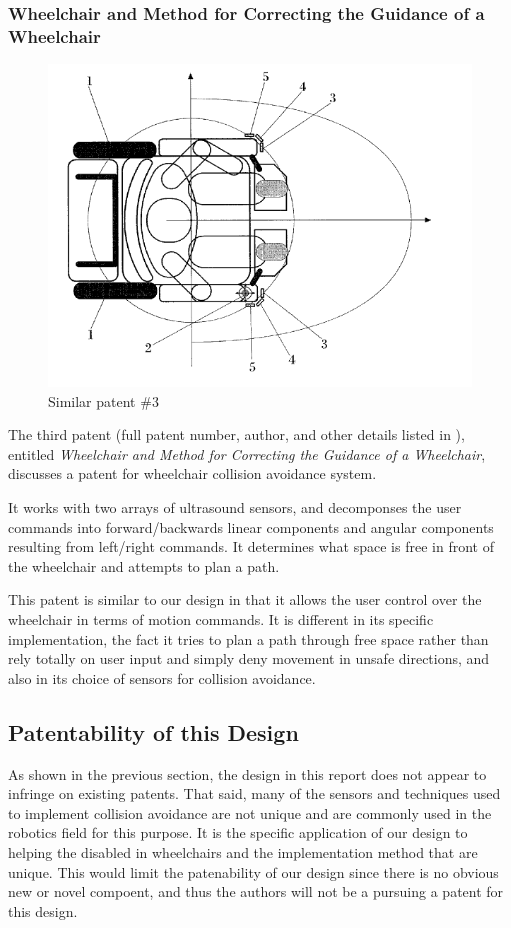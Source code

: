 \documentclass[oneside,final,a4paper]{report}
\begin{document}
\subsubsection{Wheelchair and Method for Correcting the Guidance of a Wheelchair}
\begin{figure}[hbt]
 \centering
 \includegraphics[scale=0.4]{patents3}
 \caption{Similar patent \#3 \cite{patent:wheelchair_method}}
\end{figure}

The third patent (full patent number, author, and other details listed in \cite{patent:wheelchair_method}), entitled \emph{Wheelchair and Method for Correcting the Guidance of a Wheelchair}, discusses a patent for wheelchair collision avoidance system.

It works with two arrays of ultrasound sensors, and decomponses the user commands into forward/backwards linear components and angular components resulting from left/right commands. It determines what space is free in front of the wheelchair and attempts to plan a path.

This patent is similar to our design in that it allows the user control over the wheelchair in terms of motion commands. It is different in its specific implementation, the fact it tries to plan a path through free space rather than rely totally on user input and simply deny movement in unsafe directions, and also in its choice of sensors for collision avoidance.

\subsection{Patentability of this Design}
As shown in the previous section, the design in this report does not appear to infringe on existing patents. That said, many of the sensors and techniques used to implement collision avoidance are not unique and are commonly used in the robotics field for this purpose. It is the specific application of our design to helping the disabled in wheelchairs and the implementation method that are unique. This would limit the patenability of our design since there is no obvious new or novel compoent, and thus the authors will not be a pursuing a patent for this design.
\end{document}
